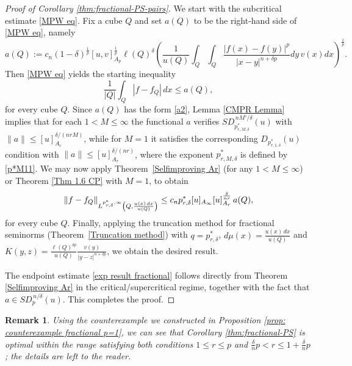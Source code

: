 \documentclass[reqno, 10pt, oneside]{amsart}
\numberwithin{equation}{section}
\newcommand{\strt}[1]{\rule{0pt}{#1}}
\newtheorem{remark}[theorem]{Remark}
\numberwithin{theorem}{section}
\newcommand{\1}{{\rm 1\hspace*{-0.4ex}%
\rule{0.1ex}{1.52ex}\hspace*{0.2ex}}}
\newcommand{\ed}{\color{black}}
\begin{document}
\begin{proof}[Proof of Corollary \ref{thm:fractional-PS-pairs}]
We start with the subcritical estimate \eqref{MPW eq}. Fix a cube $Q$ and set $a(Q)$ to be the right-hand side of \eqref{MPW eq}, namely
\begin{equation*}
	a(Q):= c_n (1-\delta)^\frac{1}{p} [u,v]_{A_p}^\frac{1}{p} \ell(Q)^\delta \left( \frac{1}{u(Q)} \int_Q \int_Q \frac{|f(x)-f(y)|^p}{|x-y|^{n+\delta p }} dy\, v(x) dx\right)^\frac{1}{p}.
\end{equation*}
Then \eqref{MPW eq} yields the starting inequality
\begin{equation*}
	\frac{1}{|Q|}\int_Q |f-f_Q|\,dx \le a(Q),
\end{equation*}
for every cube $Q$. Since $a(Q)$ has the form \eqref{a2}, Lemma \ref{CMPR Lemma} implies that for each $1<M\le\infty$ the functional $a$ verifies $SD_{p^{*}_{r,M,\delta}}^{\,nM'/\delta}(u)$ with $\|a\|\le [u]_{A_r}^{\delta/(nrM)}$,  while for $M=1$ it satisfies the corresponding $D_{p^{*}_{r,1,\delta}}(u)$ condition with $\|a\|\le [u]_{A_r}^{\delta/(nr)}$, where the exponent $p^{*}_{r,M,\delta}$ is defined by \eqref{p*M11}. We may now apply Theorem~\ref{Selfimproving Ar} (for any $1<M\le\infty$) or Theorem \ref{Thm 1.6 CP} with $M=1$, to obtain
\begin{equation*}
	\|f-f_Q\|_{\strt{2.3ex} L^{p^*_{r,\delta},\infty}\left(Q,\frac{u(x)\,dx}{u(Q)}\right)} \le c_n p^*_{r, \delta}  [u]_{A_\infty} [u]_{A_r}^{\frac{\delta }{nr}}   \,a(Q),
\end{equation*}
for every cube $Q$. Finally, applying the truncation method for fractional seminorms (Theorem~\ref{Truncation method}) with $q=p^*_{r,\delta}$, $d\mu(x)=\frac{u(x)\,dx}{u(Q)}$ and $K(y,z)=\frac{\ell(Q)^{\delta p}}{u(Q)}\frac{v(y)}{|y-z|^{n+\delta p}}$, we obtain the desired result. 

The endpoint estimate \eqref{exp result fractional} follows directly from Theorem \ref{Selfimproving Ar} in the critical/supercritical regime, together with the fact that $a \in SD_p^{\,n/\delta}(u)$. This completes the proof.
\end{proof}


\ed 


\begin{remark}{\label{Fractional PS sharpness}}
Using the counterexample we constructed in Proposition \ref{prop: counterexample fractional p=1}, we can see that Corollary \ref{thm:fractional-PS} is optimal within the range satisfying both conditions $ 1 \le r \le p $ and $ \frac{\delta}{n}p < r \le 1 + \frac{\delta}{n}p$; the details are left to the reader. 
\end{remark}
\end{document}
